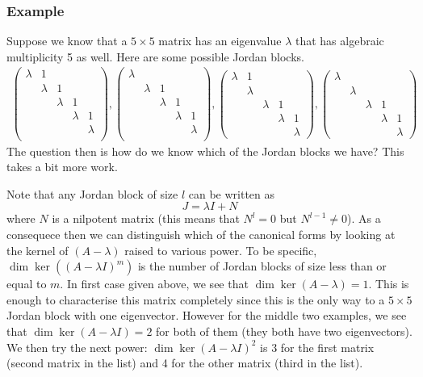 \subsubsection{Example}
Suppose we know that a $5 \times 5$ matrix has an eigenvalue $\lambda$ that has algebraic multiplicity 5 as well. Here are some possible Jordan blocks.
\begin{align*}
    \begin{pmatrix}
    \lambda & 1 & & & \\
    & \lambda & 1 \\
    & & \lambda & 1 \\
    & & & \lambda & 1 \\
    & & & & \lambda\\
    \end{pmatrix}, 
    \begin{pmatrix}
    \lambda & & & & \\
    & \lambda & 1 \\
    & & \lambda & 1 \\
    & & & \lambda & 1 \\
    & & & & \lambda\\
    \end{pmatrix}, 
    \begin{pmatrix}
    \lambda & 1 & & &\\
    & \lambda \\
    & & \lambda & 1 \\
    & & & \lambda & 1\\
    & & & & \lambda
    \end{pmatrix},
    \begin{pmatrix}
    \lambda & & & &\\
    & \lambda \\
    & & \lambda & 1 \\
    & & & \lambda & 1\\
    & & & & \lambda
    \end{pmatrix}
\end{align*}
The question then is how do we know which of the Jordan blocks we have? This takes a bit more work.

Note that any Jordan block of size $l$ can be written as
$$ J = \lambda I + N $$
where $N$ is a nilpotent matrix (this means that $N^l = 0$ but $N^{l - 1} \neq 0$). As a consequece then we can distinguish which of the canonical forms by looking at the kernel of $(A - \lambda)$ raised to various power. To be specific, $\dim \ker((A - \lambda I)^{m})$ is the number of Jordan blocks of size less than or equal to $m$. In first case given above, we see that $\dim \ker(A - \lambda) = 1$. This is enough to characterise this matrix completely since this is the only way to a $5 \times 5$ Jordan block with one eigenvector. However for the middle two examples, we see that $\dim \ker (A - \lambda I) = 2$ for both of them (they both have two eigenvectors). We then try the next power: $\dim \ker(A - \lambda I)^2$ is 3 for the first matrix (second matrix in the list) and 4 for the other matrix (third in the list).

